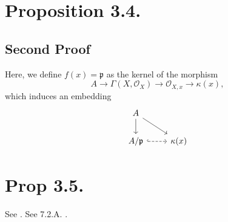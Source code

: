 \section{Proposition 3.4.}

\subsection{Second Proof}

Here, we define $f(x)=\mathfrak p$ as the kernel of the morphism 
\[A\to\Gamma(X,\mathcal O_X)\to \mathcal O_{X,x}\to \kappa (x),\] which induces an embedding 
\[\begin{tikzcd}
	A \\
	{A/\mathfrak p} & {\kappa (x)}
	\arrow[from=1-1, to=2-1]
	\arrow[from=1-1, to=2-2]
	\arrow[dashed, hook, from=2-1, to=2-2]
\end{tikzcd}\]

\section{Prop 3.5.}

See \label{Rising Sea 7.2.A.}. See 7.2.A. \cite{RaviRisingSea}.